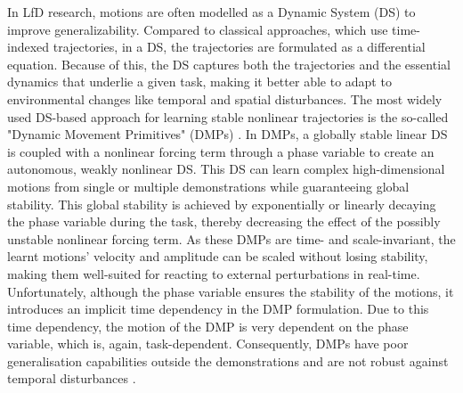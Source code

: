 In LfD research, motions are often modelled as a Dynamic System (DS) \cite{khansari-zadehLearningStableNonlinear2011} to improve generalizability. Compared to classical approaches, which use time-indexed trajectories, in a DS, the trajectories are formulated as a differential equation. Because of this, the DS captures both the trajectories and the essential dynamics that underlie a given task, making it better able to adapt to environmental changes like temporal and spatial disturbances. The most widely used DS-based approach for learning stable nonlinear trajectories is the so-called "Dynamic Movement Primitives" (DMPs) \cite{ijspeertDynamicalMovementPrimitives2013,saverianoDynamicMovementPrimitives2021,wangLearningDemonstrationUsing2021,sidiropoulosReversibleDynamicMovement2021,ginesiOvercomingDrawbacksDynamic2021,rozanecNeuralDynamicMovement2022,liProDMPsUnifiedPerspective2022}. In DMPs, a globally stable linear DS is coupled with a nonlinear forcing term through a phase variable to create an autonomous, weakly nonlinear DS. This DS can learn complex high-dimensional motions from single \cite{ijspeertDynamicalMovementPrimitives2013,prakashDynamicTrajectoryGeneration2020} or multiple demonstrations \cite{matsubaraLearningParametricDynamic2011,pervezLearningTaskparameterizedDynamic2018} while guaranteeing global stability. This global stability is achieved by exponentially or linearly decaying the phase variable during the task, thereby decreasing the effect of the possibly unstable nonlinear forcing term. As these DMPs are time- and scale-invariant, the learnt motions' velocity and amplitude can be scaled without losing stability, making them well-suited for reacting to external perturbations in real-time. Unfortunately, although the phase variable ensures the stability of the motions, it introduces an implicit time dependency in the DMP formulation. Due to this time dependency, the motion of the DMP is very dependent on the phase variable, which is, again, task-dependent. Consequently, DMPs have poor generalisation capabilities outside the demonstrations and are not robust against temporal disturbances \cite{neumannLearningRobotMotions2015}.

